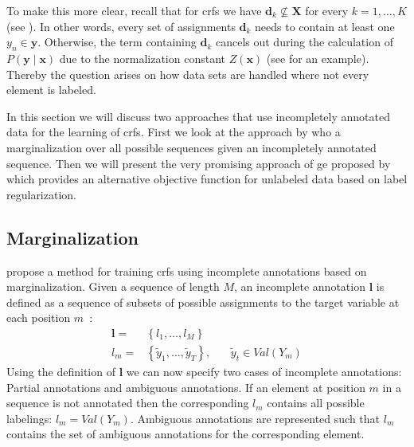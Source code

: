 To make this more clear, recall that for \glspl{crf} we have $\mathbf{d}_k\not\subseteq\mathbf{X}$ for every $k=1,\dots,K$ (see ).
In other words, every set of assignments $\mathbf{d}_k$ needs to contain at least one $y_n\in\mathbf{y}$.
Otherwise, the term containing $\mathbf{d}_k$ cancels out during the calculation of $P(\mathbf{y}\mid\mathbf{x})$ due to the normalization constant $Z(\mathbf{x})$ (see  for an example).
Thereby the question arises on how data sets are handled where not every element is labeled.

In this section we will discuss two approaches that use incompletely annotated data for the learning of \glspl{crf}.
First we look at the approach by \citet{tsuboi2008training} who a marginalization over all possible sequences given an incompletely annotated sequence.
Then we will present the very promising approach of \acrfull{ge} proposed by \citet{mann2007simple} which provides an alternative \gls{objective function} for unlabeled data based on \gls{label regularization}.

\subsection{Marginalization}

\citet{tsuboi2008training} propose a method for training \glspl{crf} using incomplete annotations based on marginalization.
Given a sequence of length $M$, an incomplete annotation $\bm{l}$ is defined as a sequence of subsets of possible assignments to the \gls{target variable} at each position $m$~\citep{tsuboi2008training}:
\begin{equation}
  \label{equ:incomplete-annotation}
  \begin{split}
  \bm{l}=& \left\{l_1,\dots,l_M\right\}\\
  l_m=& \left\{\tilde{y}_1,\dots,\tilde{y}_T\right\},\ \ \ \ \ \ \ \ \tilde{y}_t\in Val(Y_m)
  \end{split}
\end{equation}
Using the definition of $\bm{l}$ we can now specify two cases of incomplete annotations: Partial annotations and ambiguous annotations.
If an element at position $m$ in a sequence is not annotated then the corresponding $l_m$ contains all possible labelings: $l_m=Val(Y_m)$.
Ambiguous annotations are represented such that $l_m$ contains the set of ambiguous annotations for the corresponding element.

\bigskip

